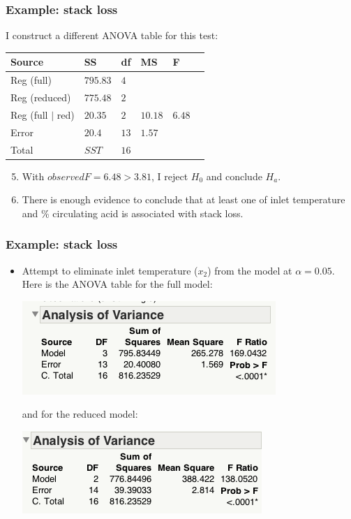 \documentclass[handout]{beamer}\usepackage[]{graphicx}\usepackage[]{color}
\numberwithin{equation}{section}
\begin{document}
\begin{frame}
\frametitle{Example: stack loss} \small
I construct a different ANOVA table for this test:
\begin{center}
\begin{tabular}{llllll}
Source & SS & df & MS & F & \\ \hline
Reg (full) & $ 795.83  $ & $4$ &  & &  \\ 
Reg (reduced) & $775.48$ & $2$&  & &  \\ 
Reg (full $\mid$ red) & $20.35$ & $2$ & $10.18$ & $6.48$ &  \\ 
Error & $20.4$ & $13$ & $1.57$& & \\ \hline
Total & $SST$ & $16$ & & & 
\end{tabular}
\end{center}
\begin{enumerate}
\setcounter{enumi}{4}
\pause \item With $observed F = 6.48 > 3.81$, I reject $H_0$ and conclude $H_a$.
\pause \item There is enough evidence to conclude that at least one of inlet temperature and \% circulating acid is associated with stack loss.
\end{enumerate}
\end{frame}

\begin{frame}
\frametitle{Example: stack loss}
\begin{itemize}
\item Attempt to eliminate inlet temperature ($x_2$) from the model at $\alpha = 0.05$. Here is the ANOVA table for the full model:
\begin{center}
 \includegraphics{../../fig/slfullanova1.png}
\end{center}
and for the reduced model:
\begin{center}
 \includegraphics{../../fig/slredanova2.png}
\end{center}
\end{itemize}
\end{frame}
\end{document}
